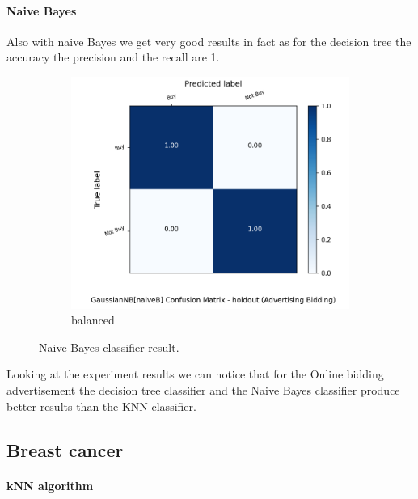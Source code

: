 \documentclass{article}
\begin{document}
\paragraph{Naive Bayes}
Also with naive Bayes we get very good results in fact as for the decision tree the accuracy the precision and the recall are 1.


\begin{figure}[H]
	\centering
	\begin{subfigure}{.5\textwidth}
		\centering
		\includegraphics[width=1.1\textwidth]{Plots/advertisingBidding_GaussianNB_naiveB_balance_True_holdout.png}
		\caption{balanced}
	\end{subfigure}%
	\caption{{\color{red} Naive Bayes classifier result.}}
\end{figure}


Looking at the experiment results we can notice that for the Online bidding advertisement the decision tree classifier and the Naive Bayes classifier produce better results than the KNN classifier.





\subsection{Breast cancer}


\paragraph{kNN algorithm }
\end{document}
